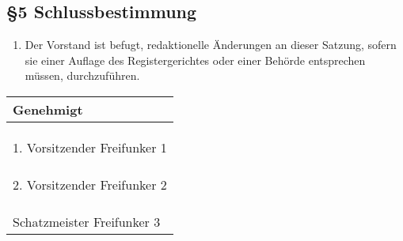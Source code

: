 \documentclass[12pt,a4paper]{article}
\newcommand{\VorstandEins}{Freifunker 1}
\newcommand{\VorstandZwei}{Freifunker 2}
\newcommand{\Schatzmeister}{Freifunker 3}
\begin{document}
\subsection*{§5 Schlussbestimmung}
\begin{enumerate}
\item Der Vorstand ist befugt, redaktionelle Änderungen an dieser Satzung, sofern sie einer Auflage des Registergerichtes oder einer Behörde entsprechen müssen, durchzuführen.
\end{enumerate}
\bigskip
\begin{center}

\begin{tabular}{|p{15cm}|}
\hline 
Genehmigt \\ 
\hline 
 \\
 \\
 \\
\hline 
1. Vorsitzender \VorstandEins \\ 
\hline 
 \\
 \\
 \\
\hline 
2. Vorsitzender \VorstandZwei \\ 
\hline
 \\
 \\
 \\
\hline
Schatzmeister \Schatzmeister \\
\hline
\end{tabular} 

\end{center}
\end{document}
